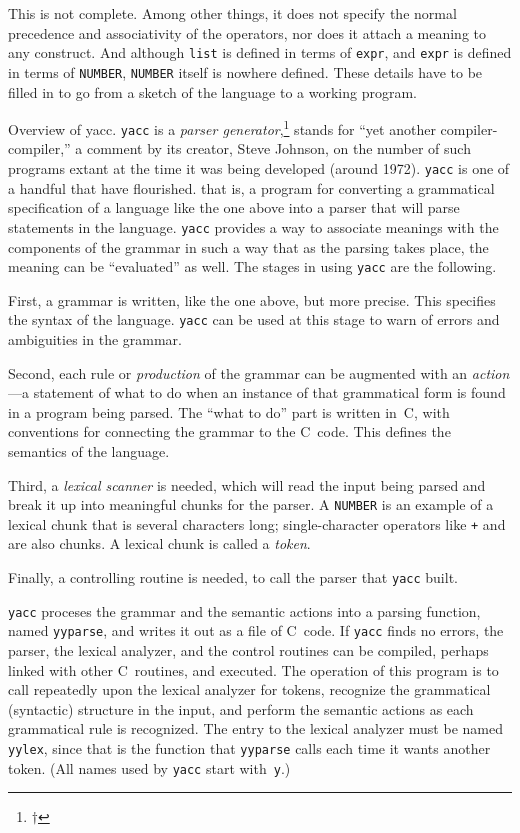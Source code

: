 This is not complete. Among other things, it does not specify
the normal precedence and associativity of the operators, nor
does it attach a meaning to any construct. And although {\tt list}
is defined in terms of {\tt expr}, and {\tt expr} is defined in
terms of {\tt NUMBER}, {\tt NUMBER} itself is nowhere defined.
These details have to be filled in to go from a sketch of the
language to a working program.

\subsect Overview of yacc.
{\tt yacc} is a {\it parser generator},\footnote{$\dag$}{%
 stands for ``yet another compiler-compiler,''
a comment by its creator, Steve Johnson, on the number of such
programs extant at the time it was being developed (around 1972).
{\tt yacc} is one of a handful that have flourished.} that is, a
program for converting a grammatical specification of a language
like the one above into a parser that will parse statements in the
language. {\tt yacc} provides a way to associate meanings with
the components of the grammar in such a way that as the parsing
takes place, the meaning can be ``evaluated'' as well. The stages
in using {\tt yacc} are the following.

First, a grammar is written, like the one above, but more precise.
This specifies the syntax of the language. {\tt yacc} can be used
at this stage to warn of errors and ambiguities in the grammar.

Second, each rule or {\it production\/} of the grammar can be
augmented with an {\it action}---a statement of what to do
when an instance of that grammatical form is found in a program
being parsed. The ``what to do'' part is written in~C, with
conventions for connecting the grammar to the C~code.
This defines the semantics of the language.

Third, a {\it lexical scanner\/} is needed, which will read
the input being parsed and break it up into meaningful chunks
for the parser. A {\tt NUMBER} is an example of a lexical
chunk that is several characters long; single-character operators
like {\tt+} and {\tt*} are also chunks. A lexical chunk is called
a {\it token}.

Finally, a controlling routine is needed, to call the parser
that {\tt yacc} built.

{\tt yacc} proceses the grammar and the semantic actions into
a parsing function, named {\tt yyparse}, and writes it out as
a file of C~code. If {\tt yacc} finds no errors, the parser,
the lexical analyzer, and the control routines can be compiled,
perhaps linked with other C~routines, and executed. The operation
of this program is to call repeatedly upon the lexical analyzer
for tokens, recognize the grammatical (syntactic) structure in the
input, and perform the semantic actions as each grammatical rule
is recognized. The entry to the lexical analyzer must be named
{\tt yylex}, since that is the function that {\tt yyparse} calls
each time it wants another token. (All names used by {\tt yacc}
start with~{\tt y}.)

